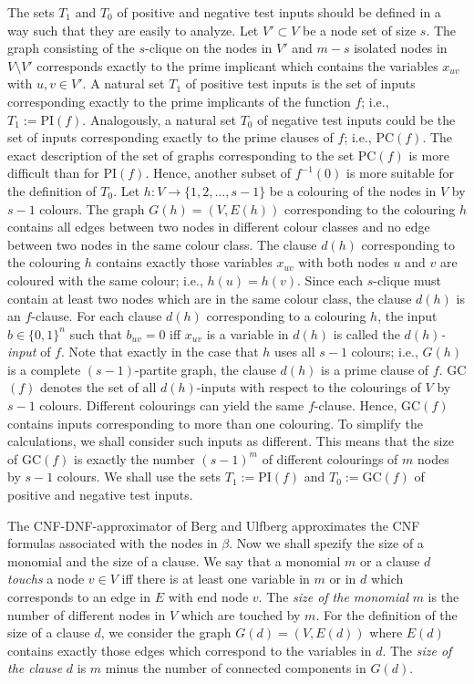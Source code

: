 \documentclass[11pt]{article}
\begin{document}
The sets $T_1$ and $T_0$ of positive and negative test inputs should be defined in a way such that they
are easily to analyze. 
Let $V' \subset V$ be a node set of size $s$. The graph consisting of the $s$-clique on the nodes in $V'$
and $m - s$ isolated nodes in $V \setminus V'$ corresponds exactly to the prime implicant which contains 
the variables $x_{uv}$ with $u,v \in V'$. A natural set $T_1$ of positive test inputs is the set of inputs
corresponding exactly to the prime implicants of the function $f$; i.e., $T_1 := \mbox{PI}(f)$. 
Analogously, a natural set $T_0$ of negative test inputs could be the set of inputs corresponding exactly to
the prime clauses of $f$; i.e., $\mbox{PC}(f)$. The exact description of the set of graphs corresponding to the
set $\mbox{PC}(f)$ is more difficult than for $\mbox{PI}(f)$. Hence, another subset of $f^{-1}(0)$ is more suitable
for the definition of $T_0$. 
Let $h:V \rightarrow \{1,2, \ldots,s-1\}$ be a colouring of the nodes in $V$ by $s-1$ colours. The graph
$G(h) = (V,E(h))$ corresponding to the colouring $h$ contains all edges between two nodes in
different colour classes and no edge between two nodes in the same colour class. The clause $d(h)$ corresponding
to the colouring $h$ contains exactly those variables $x_{uv}$ with both nodes $u$ and $v$ are coloured with the
same colour; i.e., $h(u) = h(v)$. Since each $s$-clique must contain at least two nodes which are in the same colour
class, the clause $d(h)$ is an $f$-clause. For each clause $d(h)$ corresponding to a colouring $h$, the input
$b \in \{0,1\}^n$ such that $b_{uv} = 0$ iff $x_{uv}$ is a variable in $d(h)$ is called the {\em $d(h)$-input} of $f$.
Note that exactly in the case that $h$ uses all $s-1$ colours; i.e., $G(h)$ is a complete $(s-1)$-partite graph, the
clause $d(h)$ is a prime clause of $f$. GC$(f)$ denotes the set of all $d(h)$-inputs with respect to the colourings
of $V$ by $s-1$ colours.
Different colourings can yield the same $f$-clause. Hence, GC$(f)$ contains inputs corresponding to more than one
colouring. To simplify the calculations, we shall consider such inputs as different. This means that
the size of GC$(f)$ is exactly the number $(s-1)^m$ of different colourings of $m$ nodes by $s-1$ colours.
We shall use the sets $T_1 := \mbox{PI}(f)$ and $T_0 := \mbox{GC}(f)$ of positive and negative test inputs.

The CNF-DNF-approximator of Berg and Ulfberg approximates the CNF formulas associated with the nodes in $\beta$.
Now we shall spezify the size of a monomial and the size of a clause.  We say that a monomial $m$ or a clause
$d$ {\em touchs\/} a node $v \in V$ iff there is at least one variable in $m$ or in $d$ which corresponds to an edge
in $E$ with end node $v$.
The {\em size of the monomial\/} $m$ is the number of different nodes in $V$ which are touched by $m$.
For the definition of the size of a clause $d$, we consider the graph $G(d) = (V,E(d))$ where $E(d)$
contains exactly those edges which correspond to the variables in $d$. The {\em size of the clause\/} $d$ is
$m$ minus the number of connected components in $G(d)$.
\end{document}
